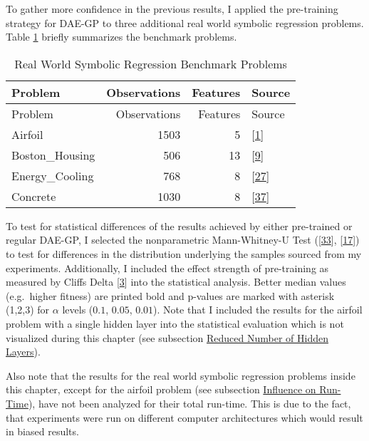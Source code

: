 \documentclass[
  11pt,
]{article}
\begin{document}
To gather more confidence in the previous results, I applied the pre-training strategy for DAE-GP to three additional real world symbolic regression problems.
Table \ref{tab:full-run-realWorldSymReg-problems} briefly summarizes the benchmark problems.

\begin{longtable}[]{@{}lrrl@{}}
\caption{\label{tab:full-run-realWorldSymReg-problems}Real World Symbolic Regression Benchmark Problems}\tabularnewline
\toprule\noalign{}
Problem & Observations & Features & Source \\
\midrule\noalign{}
\endfirsthead
\toprule\noalign{}
Problem & Observations & Features & Source \\
\midrule\noalign{}
\endhead
\bottomrule\noalign{}
\endlastfoot
Airfoil & 1503 & 5 & {[}\protect\hyperlink{ref-AIRFOIL_DATASET}{1}{]} \\
Boston\_Housing & 506 & 13 & {[}\protect\hyperlink{ref-BOSTON_HOUSING_DATASET}{9}{]} \\
Energy\_Cooling & 768 & 8 & {[}\protect\hyperlink{ref-ENERGY_DATASET}{27}{]} \\
Concrete & 1030 & 8 & {[}\protect\hyperlink{ref-CONCRETE_DATASET}{37}{]} \\
\end{longtable}

To test for statistical differences of the results achieved by either pre-trained or regular DAE-GP, I selected the nonparametric Mann-Whitney-U Test ({[}\protect\hyperlink{ref-mwu1}{33}{]}, {[}\protect\hyperlink{ref-mwu2}{17}{]}) to test for differences in the distribution underlying the samples sourced from my experiments.
Additionally, I included the effect strength of pre-training as measured by Cliffs Delta {[}\protect\hyperlink{ref-Cliff1993DominanceSO}{3}{]} into the statistical analysis.
Better median values (e.g.~higher fitness) are printed bold and p-values are marked with asterisk (1,2,3) for \(\alpha\) levels (\(0.1\), \(0.05\), \(0.01\)).
Note that I included the results for the airfoil problem with a single hidden layer into the statistical evaluation which is not visualized during this chapter (see subsection \protect\hyperlink{reduced-number-of-hidden-layers}{Reduced Number of Hidden Layers}).

Also note that the results for the real world symbolic regression problems inside this chapter, except for the airfoil problem (see subsection \protect\hyperlink{influence-on-run-time}{Influence on Run-Time}), have not been analyzed for their total run-time.
This is due to the fact, that experiments were run on different computer architectures which would result in biased results.
\end{document}
